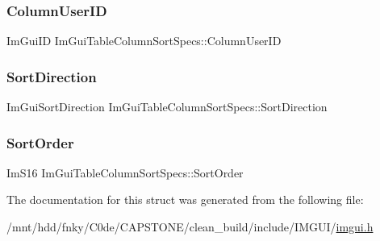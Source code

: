 \subsubsection{\texorpdfstring{Column\+User\+ID}{ColumnUserID}}
{\footnotesize\ttfamily Im\+Gui\+ID Im\+Gui\+Table\+Column\+Sort\+Specs\+::\+Column\+User\+ID}

\mbox{\label{structImGuiTableColumnSortSpecs_ab0c2670b73e504825ae3d73b61f3916f}} 
\subsubsection{\texorpdfstring{Sort\+Direction}{SortDirection}}
{\footnotesize\ttfamily Im\+Gui\+Sort\+Direction Im\+Gui\+Table\+Column\+Sort\+Specs\+::\+Sort\+Direction}

\mbox{\label{structImGuiTableColumnSortSpecs_a53bb2301b5c97cce7b44cabb2f505df4}} 
\subsubsection{\texorpdfstring{Sort\+Order}{SortOrder}}
{\footnotesize\ttfamily Im\+S16 Im\+Gui\+Table\+Column\+Sort\+Specs\+::\+Sort\+Order}



The documentation for this struct was generated from the following file\+:\begin{DoxyCompactItemize}
\item 
/mnt/hdd/fnky/\+C0de/\+C\+A\+P\+S\+T\+O\+N\+E/clean\+\_\+build/include/\+I\+M\+G\+U\+I/\hyperlink{imgui_8h}{imgui.\+h}\end{DoxyCompactItemize}
